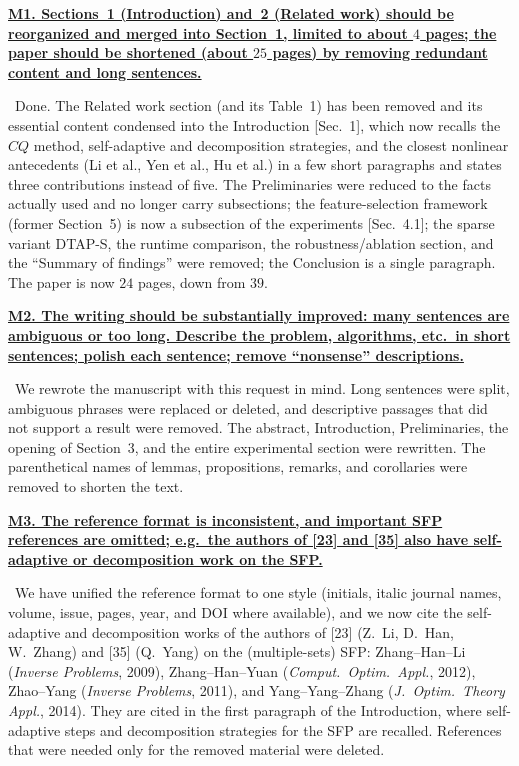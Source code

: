 \documentclass[11pt]{article}
\newcommand{\response}[1]{\smallskip\noindent{\color{blue!60!black}\textbf{Response.}}\ #1\par\medskip}
\newcommand{\loc}[1]{\textcolor{blue!50!black}{[#1]}}
\newenvironment{point}[1]{\medskip\noindent\textbf{\uline{#1}}\par}{\par}
\begin{document}
\begin{point}{M1. Sections~1 (Introduction) and~2 (Related work) should be reorganized and
merged into Section~1, limited to about $4$ pages; the paper should be shortened (about
$25$ pages) by removing redundant content and long sentences.}
\response{Done. The Related work section (and its Table~1) has been removed and its
essential content condensed into the Introduction \loc{Sec.~1}, which now recalls the
$CQ$ method, self-adaptive and decomposition strategies, and the closest nonlinear
antecedents (Li et al., Yen et al., Hu et al.) in a few short paragraphs and states three
contributions instead of five. The Preliminaries were reduced to the facts actually used
and no longer carry subsections; the feature-selection framework (former Section~5) is now
a subsection of the experiments \loc{Sec.~4.1}; the sparse variant DTAP-S, the runtime
comparison, the robustness/ablation section, and the ``Summary of findings'' were removed;
the Conclusion is a single paragraph. The paper is now $24$ pages, down from $39$.}
\end{point}

\begin{point}{M2. The writing should be substantially improved: many sentences are
ambiguous or too long. Describe the problem, algorithms, etc.\ in short sentences; polish
each sentence; remove ``nonsense'' descriptions.}
\response{We rewrote the manuscript with this request in mind. Long sentences were split,
ambiguous phrases were replaced or deleted, and descriptive passages that did not support
a result were removed. The abstract, Introduction, Preliminaries, the opening of Section~3,
and the entire experimental section were rewritten. The parenthetical names of lemmas,
propositions, remarks, and corollaries were removed to shorten the text.}
\end{point}

\begin{point}{M3. The reference format is inconsistent, and important SFP references are
omitted; e.g.\ the authors of [23] and [35] also have self-adaptive or decomposition work
on the SFP.}
\response{We have unified the reference format to one style (initials, italic journal
names, volume, issue, pages, year, and DOI where available), and we now cite the
self-adaptive and decomposition works of the authors of [23] (Z.~Li, D.~Han, W.~Zhang) and
[35] (Q.~Yang) on the (multiple-sets) SFP: Zhang--Han--Li (\emph{Inverse Problems}, 2009),
Zhang--Han--Yuan (\emph{Comput.\ Optim.\ Appl.}, 2012), Zhao--Yang (\emph{Inverse
Problems}, 2011), and Yang--Yang--Zhang (\emph{J.\ Optim.\ Theory Appl.}, 2014). They are
cited in the first paragraph of the Introduction, where self-adaptive steps and
decomposition strategies for the SFP are recalled. References that were needed only for the
removed material were deleted.}
\end{point}
\end{document}
